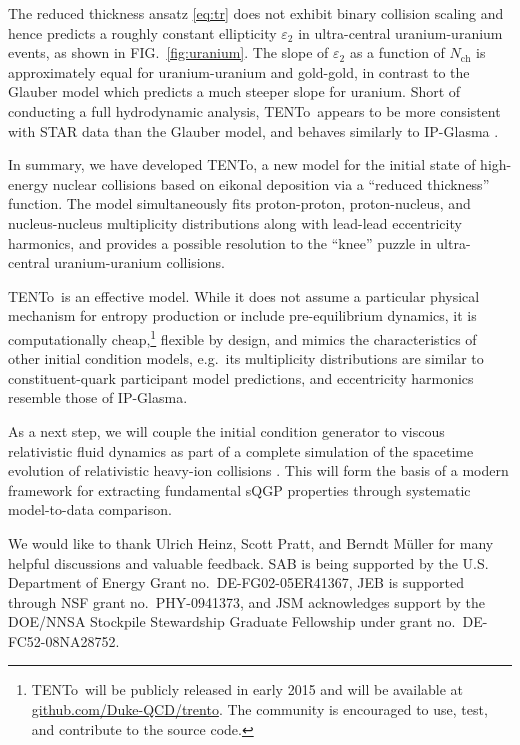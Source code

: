 \documentclass[aps,prc,reprint,amsmath,nofootinbib]{revtex4-1}
\newcommand{\trento}{T\raisebox{-.5ex}{R}ENTo}
\newcommand{\nch}{N_\text{ch}}
\begin{document}
The reduced thickness ansatz \eqref{eq:tr} does not exhibit binary collision scaling and hence predicts a roughly constant ellipticity $\varepsilon_2$ in ultra-central uranium-uranium events, as shown in FIG.~\ref{fig:uranium}.
The slope of $\varepsilon_2$ as a function of $\nch$ is approximately equal for uranium-uranium and gold-gold, in contrast to the Glauber model which predicts a much steeper slope for uranium.
Short of conducting a full hydrodynamic analysis, \trento\ appears to be more consistent with STAR data than the Glauber model, and behaves similarly to IP-Glasma \cite{Wang:2014qxa}.


In summary, we have developed \trento, a new model for the initial state of high-energy nuclear collisions based on eikonal deposition via a ``reduced thickness'' function.
The model simultaneously fits proton-proton, proton-nucleus, and nucleus-nucleus multiplicity distributions along with lead-lead eccentricity harmonics, and provides a possible resolution to the ``knee'' puzzle in ultra-central uranium-uranium collisions.

\trento\ is an effective model.
While it does not assume a particular physical mechanism for entropy production or include pre-equilibrium dynamics, it is computationally cheap,\footnote{
  \trento\ will be publicly released in early 2015 and will be available at \url{github.com/Duke-QCD/trento}.
  The community is encouraged to use, test, and contribute to the source code.
}
flexible by design, and mimics the characteristics of other initial condition models, e.g.~its multiplicity distributions are similar to constituent-quark participant model predictions, and eccentricity harmonics resemble those of IP-Glasma.

As a next step, we will couple the initial condition generator to viscous relativistic fluid dynamics as part of a complete simulation of the spacetime evolution of relativistic heavy-ion collisions \cite{Shen:2014vra}.
This will form the basis of a modern framework for extracting fundamental sQGP properties through systematic model-to-data comparison.


\medskip\noindent
We would like to thank Ulrich Heinz, Scott Pratt, and Berndt M\"uller for many helpful discussions and valuable feedback.
SAB is being supported by the U.S. Department of Energy Grant no.~DE-FG02-05ER41367,
JEB is supported through NSF grant no.~PHY-0941373,
and JSM acknowledges support by the DOE/NNSA Stockpile Stewardship Graduate Fellowship under grant no.~DE-FC52-08NA28752.


\end{document}
